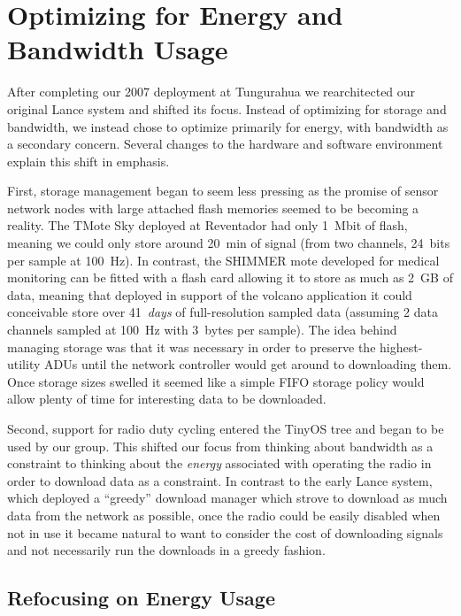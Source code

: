 \section{Optimizing for Energy and Bandwidth Usage}
\label{sec-lance}
\label{sec-utilitylance}

After completing our 2007 deployment at Tungurahua we rearchitected
our original Lance system and shifted its focus. Instead of optimizing for
storage and bandwidth, we instead chose to optimize primarily for energy,
with bandwidth as a secondary concern. Several changes to the hardware and
software environment explain this shift in emphasis.

First, storage management began to seem less pressing as the promise of
sensor network nodes with large attached flash memories seemed to be becoming
a reality.  The TMote Sky deployed at Reventador had only 1~Mbit of flash,
meaning we could only store around 20~min of signal (from two channels,
24~bits per sample at 100~Hz). In contrast, the SHIMMER mote developed for
medical monitoring can be fitted with a flash card allowing it to store as
much as 2~GB of data, meaning that deployed in support of the volcano
application it could conceivable store over 41~\textit{days} of
full-resolution sampled data (assuming 2 data channels sampled at 100~Hz with
3~bytes per sample).  The idea behind managing storage was that it was
necessary in order to preserve the highest-utility ADUs until the network
controller would get around to downloading them. Once storage sizes swelled
it seemed like a simple FIFO storage policy would allow plenty of time for
interesting data to be downloaded.

Second, support for radio duty cycling entered the TinyOS tree and began to
be used by our group. This shifted our focus from thinking about bandwidth as
a constraint to thinking about the \textit{energy} associated with operating
the radio in order to download data as a constraint. In contrast to the early
Lance system, which deployed a ``greedy'' download manager which strove to
download as much data from the network as possible, once the radio could be
easily disabled when not in use it became natural to want to consider the
cost of downloading signals and not necessarily run the downloads in a greedy
fashion. 

\subsection{Refocusing on Energy Usage}

